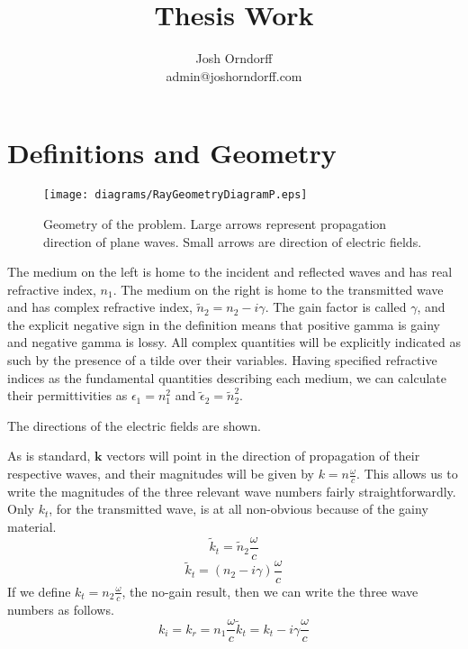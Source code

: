 \documentclass[10pt,a4paper]{article}
\begin{document}
\title{Thesis Work}
\author{Josh Orndorff \\ admin@joshorndorff.com}
\maketitle

\section{Definitions and Geometry}
\begin{figure}[htb]
\centering
\texttt{[image: diagrams/RayGeometryDiagramP.eps]}
\caption{Geometry of the problem. Large arrows represent propagation direction of plane waves. Small arrows are direction of electric fields.}
\end{figure}

The medium on the left is home to the incident and reflected waves and has real refractive index, $n_1$.  The medium on the right is home to the transmitted wave and has complex refractive index, $\tilde{n}_2=n_2-i\gamma$. The gain factor is called $\gamma$, and the explicit negative sign in the definition means that positive gamma is gainy and negative gamma is lossy. All complex quantities will be explicitly indicated as such by the presence of a tilde over their variables. Having specified refractive indices as the fundamental quantities describing each medium, we can calculate their permittivities as $\epsilon_1=n_1^2$ and $\tilde{\epsilon}_2=\tilde{n}_2^2$.

The directions of the electric fields are shown.

As is standard, $\mathbf{k}$ vectors will point in the direction of propagation of their respective waves, and their magnitudes will be given by $k=n\frac{\omega}{c}$. This allows us to write the magnitudes of the three relevant wave numbers fairly straightforwardly.  Only $k_t$, for the transmitted wave, is at all non-obvious because of the gainy material.
\begin{equation}
\tilde{k}_t=\tilde{n}_2\frac{\omega}{c}
\end{equation}
\begin{equation}
\tilde{k}_t=(n_2-i\gamma)\frac{\omega}{c}
\end{equation}
If we define $k_t=n_2\frac{\omega}{c}$, the no-gain result, then we can write the three wave numbers as follows.
\begin{subequations}
\begin{equation}
k_i=k_r=n_1\frac{\omega}{c}
\end{equation}
\begin{equation}
\tilde{k}_t=k_t-i\gamma\frac{\omega}{c}
\end{equation}
\end{subequations}
\end{document}
